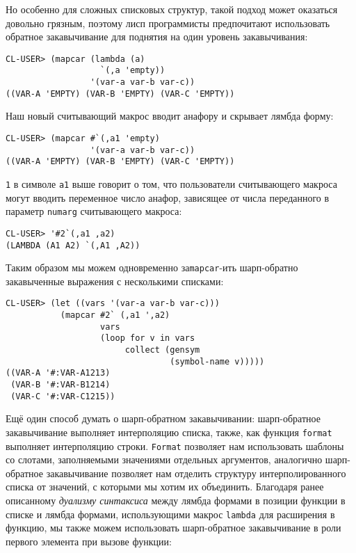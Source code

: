 Но особенно для сложных списковых структур, такой подход может оказаться довольно грязным, поэтому лисп программисты предпочитают использовать обратное закавычивание для поднятия на один уровень закавычивания:

\begin{verbatim}
CL-USER> (mapcar (lambda (a)
                   `(,a 'empty))
                 '(var-a var-b var-c))
((VAR-A 'EMPTY) (VAR-B 'EMPTY) (VAR-C 'EMPTY))
\end{verbatim}

Наш новый считывающий макрос вводит анафору и скрывает лямбда форму:

\begin{verbatim}
CL-USER> (mapcar #`(,a1 'empty)
                 '(var-a var-b var-c))
((VAR-A 'EMPTY) (VAR-B 'EMPTY) (VAR-C 'EMPTY))
\end{verbatim}

\verb"1" в символе \verb"a1" выше говорит о том, что пользователи считывающего макроса могут вводить переменное число анафор, зависящее от числа переданного в параметр \verb"numarg" считывающего макроса:

\begin{verbatim}
CL-USER> '#2`(,a1 ,a2)
(LAMBDA (A1 A2) `(,A1 ,A2))
\end{verbatim}

Таким образом мы можем одновременно за\verb"mapcar"-ить шарп-обратно закавыченные выражения с несколькими списками:

\begin{verbatim}
CL-USER> (let ((vars '(var-a var-b var-c)))
           (mapcar #2` (,a1 ',a2)
                   vars
                   (loop for v in vars
                        collect (gensym
                                 (symbol-name v)))))
((VAR-A '#:VAR-A1213) 
 (VAR-B '#:VAR-B1214) 
 (VAR-C '#:VAR-C1215))
\end{verbatim}

Ещё один способ думать о шарп-обратном закавычивании: шарп-об\-рат\-ное закавычивание выполняет интерполяцию списка, также, как функция \verb"format" выполняет интерполяцию строки. \verb"Format" позволяет нам использовать шаблоны со слотами, заполняемыми значениями отдельных аргументов, аналогично шарп-обратное закавычивание позволяет нам отделить структуру интерполированного списка от значений, с которыми мы хотим их объединить. Благодаря ранее описанному \emph{дуализму синтаксиса} между лямбда формами в позиции функции в списке и лямбда формами, использующими макрос \verb"lambda" для расширения в функцию, мы также можем использовать шарп-обратное закавычивание в роли первого элемента при вызове функции:

